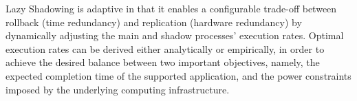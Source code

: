 Lazy Shadowing is adaptive in that it enables a configurable trade-off between rollback (time redundancy) and replication (hardware redundancy) by dynamically adjusting the main and shadow processes' execution rates.
Optimal execution rates can be derived either analytically or empirically, in order to achieve the desired balance between two important objectives, namely, the expected completion time of the supported application, and the power constraints imposed by the underlying computing infrastructure. 


